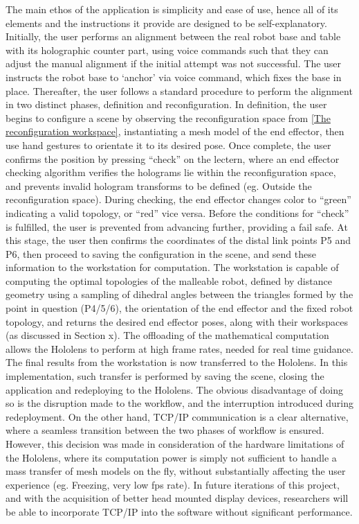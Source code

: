 The main ethos of the application is simplicity and ease of use, hence all of its elements and the instructions it provide are designed to be self-explanatory. Initially, the user performs an alignment between the real robot base and table with its holographic counter part, using voice commands such that they can adjust the manual alignment if the initial attempt was not successful. The user instructs the robot base to `anchor’ via voice command, which fixes the base in place. Thereafter, the user follows a standard procedure to perform the alignment in two distinct phases, definition and reconfiguration.
In definition, the user begins to configure a scene by observing the reconfiguration space from \ref{The reconfiguration workspace}, instantiating a mesh model of the end effector, then use hand gestures to orientate it to its desired pose. Once complete, the user confirms the position by pressing “check” on the lectern, where an end effector checking algorithm verifies the holograms lie within the reconfiguration space, and prevents invalid hologram transforms to be defined (eg. Outside the reconfiguration space). During checking, the end effector changes color to “green” indicating a valid topology, or “red” vice versa. Before the conditions for “check” is fulfilled, the user is prevented from advancing further, providing a fail safe.
At this stage, the user then confirms the coordinates of the distal link points P5 and P6, then proceed to saving the configuration in the scene, and send these information to the workstation for computation. The workstation is capable of computing the optimal topologies of the malleable robot, defined by distance geometry using a sampling of dihedral angles between the triangles formed by the point in question (P4/5/6), the orientation of the end effector and the fixed robot topology, and returns the desired end effector poses, along with their workspaces (as discussed in Section x). The offloading of the mathematical computation allows the Hololens to perform at high frame rates, needed for real time guidance. 
The final results from the workstation is now transferred to the Hololens. In this implementation, such transfer is performed by saving the scene, closing the application and redeploying to the Hololens. The obvious disadvantage of doing so is the disruption made to the workflow, and the interruption introduced during redeployment. On the other hand, TCP/IP communication is a clear alternative, where a seamless transition between the two phases of workflow is ensured. However, this decision was made in consideration of the hardware limitations of the Hololens, where its computation power is simply not sufficient to handle a mass transfer of mesh models on the fly, without substantially affecting the user experience (eg. Freezing, very low fps rate). In future iterations of this project, and with the acquisition of better head mounted display devices, researchers will be able to incorporate TCP/IP into the software without significant performance.


